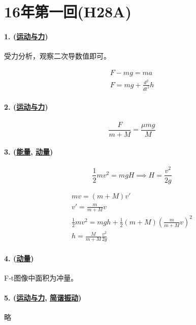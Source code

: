 
\section{16年第一回(H28A)}

\paragraph{1. (\hyperref[subsec:运动与力]{运动与力})} 受力分析，观察二次导数值即可。

\begin{gather*}
    F-mg=ma\\
    F=mg+\frac{d^2}{dt^2}h
\end{gather*}

\paragraph{2. (\hyperref[subsec:运动与力]{运动与力})}

\begin{equation*}
    \frac{F}{m+M}=\frac{\mu mg}{M}
\end{equation*}

\paragraph{3. (\hyperref[subsec:能量]{能量}, \hyperref[subsec:动量]{动量})}

\begin{equation*}
    \frac12mv^2=mgH\implies
    H=\frac{v^2}{2g}
\end{equation*}

\begin{gather*}
    mv=(m+M)v'\\
    v'=\frac{m}{m+M}v\\
    \frac12mv^2=mgh+\frac12(m+M)\left(\frac{m}{m+M}v\right)^2\\
    h=\frac{M}{m+M}\frac{v^2}{2g}
\end{gather*}

\paragraph{4. (\hyperref[subsec:动量]{动量})} F-t图像中面积为冲量。
\paragraph{5. (\hyperref[subsec:运动与力]{运动与力}, \hyperref[subsec:简谐振动]{简谐振动})} 略
